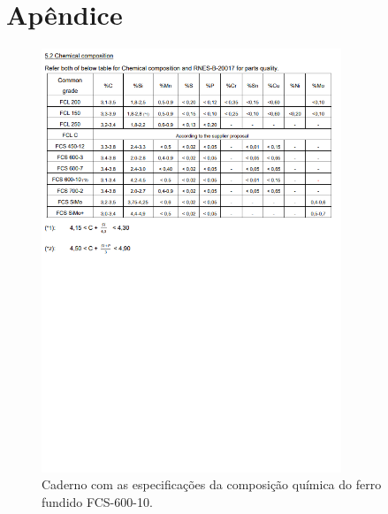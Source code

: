 \chapter{Apêndice} \label{ap:ap3}
\begin{figure}[htpb]
    \centering
    \includegraphics[width=0.8\textwidth]{Figures/Apendix/Chemical_Comp_Caixa.png}
    \caption{Caderno com as especificações da composição química do ferro fundido FCS-600-10.}
    \label{fig:chemical_comp_caixa}
\end{figure}
